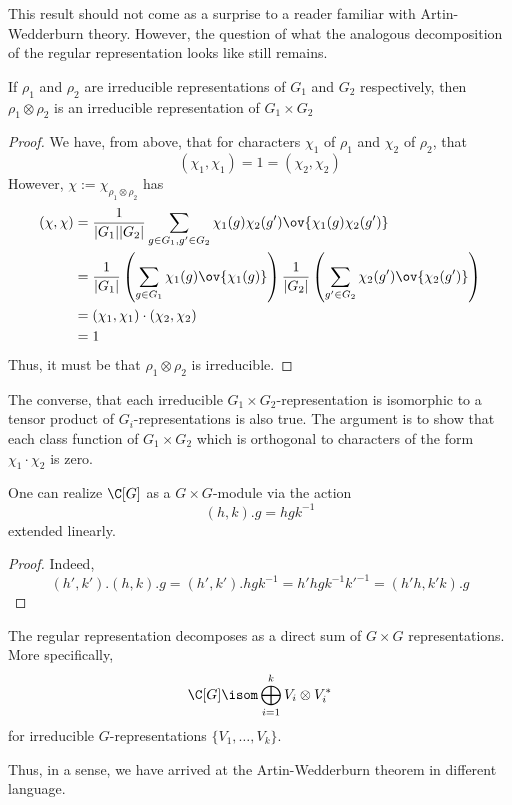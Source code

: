 \documentclass[11pt,leqno,oneside]{amsbook}
\numberwithin{thm}{section}
\begin{document}
\begin{rmk}
  This result should not come as a surprise to a reader familiar with
  Artin-Wedderburn theory. However, the question of what the
  analogous decomposition of the regular representation looks like
  still remains. 
\end{rmk}
\begin{lem}\label{tensor-of-irred-is-irred}
  If \(\rho_1\) and \(\rho_2\) are irreducible representations of
  \(G_1\) and \(G_2\) respectively, then
  \(\rho_1 \otimes \rho_2\) is an irreducible representation of \(G_1
  \times G_2\)
\end{lem}
\begin{proof}
  We have, from above, that for characters \(\chi_1\) of \(\rho_1\)
  and \(\chi_2\) of \(\rho_2\), that \[
    (\chi_1, \chi_1) = 1 = (\chi_2,\chi_2)
  \]
  However, \(\chi := \chi_{\rho_1 \otimes \rho_2}\) has
  \begin{align*}
    (\chi,\chi) & = 
    \frac{1}{|G_1||G_2|} \sum_{g \in G_1, g' \in G_2} \chi_1(g)
                  \chi_2(g') \ov{\chi_1(g) \chi_2(g')} \\
    & = \frac{1}{|G_1|} \left(
      \sum_{g \in G_1} \chi_1(g) \ov{\chi_1(g)} \right)
      \frac{1}{|G_2|} \left( 
      \sum_{g' \in G_2} \chi_2(g') \ov{\chi_2(g')} \right) \\
    & = (\chi_1, \chi_1) \cdot (\chi_2, \chi_2) \\
    & = 1
  \end{align*}
  Thus, it must be that \(\rho_1 \otimes \rho_2\) is irreducible.
\end{proof}
\begin{rmk}
  The converse, that each irreducible \(G_1 \times
  G_2\)-representation is isomorphic to a tensor product of
  \(G_i\)-representations is also true. The argument is to show that
  each class function of \(G_1 \times G_2\) which is orthogonal to
  characters of the form \(\chi_1 \cdot \chi_2\) is zero.
\end{rmk}
\begin{prop}
  One can realize \(\C[G]\) as a \(G \times G\)-module via the
  action \[
    (h,k).g = hgk^{-1}
  \]
  extended linearly. 
\end{prop}
\begin{proof}
  Indeed, \[
    (h',k').(h,k).g = (h',k').hgk^{-1} = h'hgk^{-1}k'^{-1} = (h'h,k'k).g
  \]
\end{proof}
\begin{thm}
  The regular representation decomposes as a direct sum of \(G \times
  G\) representations. More specifically, \[
    \C[G] \isom \bigoplus_{i=1}^k V_i \otimes V_i^*
  \]
  for irreducible \(G\)-representations \(\{V_1, \ldots, V_k\}\).
\end{thm}
\begin{rmk}
  Thus, in a sense, we have arrived at the Artin-Wedderburn theorem in
  different language. 
\end{rmk}
\end{document}
